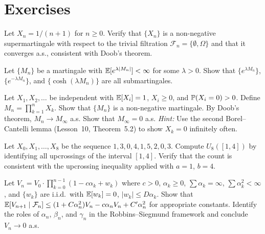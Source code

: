 \documentclass[11pt,a4paper]{article}
\begin{document}
\section{Exercises}
\label{sec:exercises}

\begin{exercise}[(*)]
\label{ex:nonneg_super_converge}
Let $X_n = 1/(n+1)$ for $n \geq 0$.  Verify that $\{X_n\}$ is a
non-negative supermartingale with respect to the trivial
filtration $\mathcal{F}_n = \{\emptyset, \Omega\}$ and that it
converges a.s., consistent with Doob's theorem.
\end{exercise}

\begin{exercise}[(*)]
\label{ex:convex_examples}
Let $\{M_n\}$ be a martingale with $\mathbb{E}[e^{\lambda |M_n|}] <
\infty$ for some $\lambda > 0$.  Show that
$\{e^{\lambda M_n}\}$, $\{e^{-\lambda M_n}\}$, and
$\{\cosh(\lambda M_n)\}$ are all submartingales.
\end{exercise}

\begin{exercise}[(**)]
\label{ex:product_martingale}
Let $X_1, X_2, \ldots$ be independent with $\mathbb{E}[X_i] = 1$,
$X_i \geq 0$, and $\mathbb{P}(X_i = 0) > 0$.  Define
$M_n = \prod_{k=1}^n X_k$.  Show that $\{M_n\}$ is a
non-negative martingale.  By Doob's theorem, $M_n \to M_\infty$
a.s.  Show that $M_\infty = 0$ a.s.
\textit{Hint:} Use the second Borel--Cantelli lemma (Lesson~10,
Theorem~5.2) to show $X_k = 0$ infinitely often.
\end{exercise}

\begin{exercise}[(**)]
\label{ex:upcrossing_computation}
Let $X_0, X_1, \ldots, X_8$ be the sequence
$1, 3, 0, 4, 1, 5, 2, 0, 3$.  Compute $U_8([1, 4])$ by
identifying all upcrossings of the interval $[1, 4]$.  Verify
that the count is consistent with the upcrossing inequality
applied with $a = 1$, $b = 4$.
\end{exercise}

\begin{exercise}[(**)]
\label{ex:rs_simple}
Let $V_n = V_0 \cdot \prod_{k=0}^{n-1}(1 - c\alpha_k + w_k)$
where $c > 0$, $\alpha_k \geq 0$, $\sum \alpha_k = \infty$,
$\sum \alpha_k^2 < \infty$, and $\{w_k\}$ are i.i.d.\ with
$\mathbb{E}[w_k] = 0$, $|w_k| \leq D\alpha_k$.  Show that
$\mathbb{E}[V_{n+1} \mid \mathcal{F}_n] \leq (1 + C\alpha_n^2) V_n -
c\alpha_n V_n + C'\alpha_n^2$
for appropriate constants.  Identify the roles of $\alpha_n$,
$\beta_n$, and $\gamma_n$ in the Robbins--Siegmund framework and
conclude $V_n \to 0$ a.s.
\end{exercise}
\end{document}
